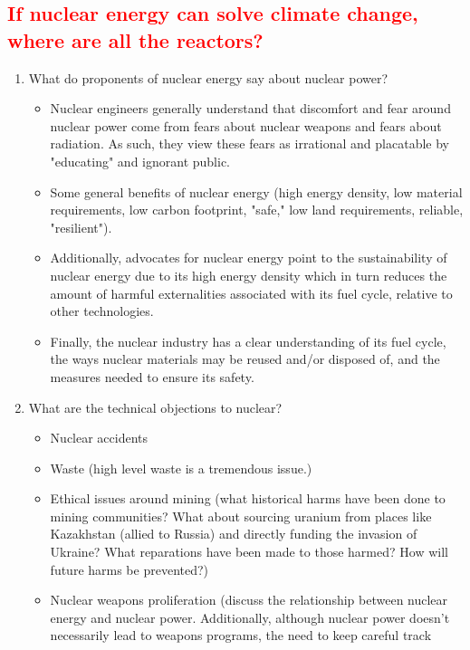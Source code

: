 \subsection{\textcolor{red}{If nuclear energy can solve climate change, where
are all the reactors?}}

\begin{enumerate}
\item What do proponents of nuclear energy say about nuclear power?
\begin{itemize}
    \item Nuclear engineers generally understand that discomfort and fear around
    nuclear power come from fears about nuclear weapons and fears about
    radiation. As such, they view these fears as irrational and placatable by
    "educating" and ignorant public.
    \item Some general benefits of nuclear energy (high energy density, low
    material requirements, low carbon footprint, "safe," low land requirements,
    reliable, "resilient").
    \item Additionally, advocates for nuclear energy point to the sustainability
    of nuclear energy due to its high energy density which in turn reduces the
    amount of harmful externalities associated with its fuel cycle, relative to
    other technologies.
    \item Finally, the nuclear industry has a clear understanding of its fuel
    cycle, the ways nuclear materials may be reused and/or disposed of, and the
    measures needed to ensure its safety.
\end{itemize}
\item What are the technical objections to nuclear?
\begin{itemize}
    \item Nuclear accidents
    \item Waste (high level waste is a tremendous issue.)
    \item Ethical issues around mining (what historical harms have been done to
    mining communities? What about sourcing uranium from places like Kazakhstan
    (allied to Russia) and directly funding the invasion of Ukraine? What
    reparations have been made to those harmed? How will future harms be
    prevented?)
    \item Nuclear weapons proliferation (discuss the relationship between
    nuclear energy and nuclear power. Additionally, although nuclear power
    doesn't necessarily lead to weapons programs, the need to keep careful track

\end{itemize}
\end{enumerate}
